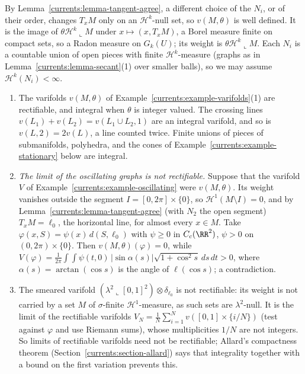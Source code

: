 By Lemma~\ref{currents:lemma-tangent-agree}, a different choice of the $N_i$, or of their order, changes $T_xM$ only on an $\mathcal{H}^k$-null set, so $v(M, \theta)$ is well defined. It is the image of
$\theta\mathcal{H}^k\llcorner M$ under $x \mapsto (x, T_xM)$, a Borel measure finite on compact sets, so a Radon measure on $G_k(U)$; its weight is $\theta\mathcal{H}^k\llcorner M$. Each $N_i$ is a countable
union of open pieces with finite $\mathcal{H}^k$-measure (graphs as in Lemma~\ref{currents:lemma-secant}(1) over smaller balls), so we may assume $\mathcal{H}^k(N_i) < \infty$.

\begin{example}\label{currents:example-rectifiable}
\begin{enumerate}
\item The varifolds $v(M, \theta)$ of Example~\ref{currents:example-varifolds}(1) are rectifiable, and integral when $\theta$ is integer valued. The crossing lines $v(L_1) + v(L_2) = v(L_1 \cup L_2, 1)$ are
an integral varifold, and so is $v(L, 2) = 2v(L)$, a line counted twice. Finite unions of pieces of submanifolds, polyhedra, and the cones of Example~\ref{currents:example-stationary} below are integral.
\item \emph{The limit of the oscillating graphs is not rectifiable.} Suppose that the varifold $V$ of Example~\ref{currents:example-oscillating} were $v(M, \theta)$. Its weight vanishes outside the segment
$I = [0, 2\pi] \times \{0\}$, so $\mathcal{H}^1(M \setminus I) = 0$, and by Lemma~\ref{currents:lemma-tangent-agree} (with $N_2$ the open segment) $T_xM = \ell_0$, the horizontal line, for almost every
$x \in M$. Take $\varphi(x, S) = \psi(x)\,d(S, \ell_0)$ with $\psi \geq 0$ in $C_c(\RR^2)$, $\psi > 0$ on $(0, 2\pi) \times \{0\}$. Then $v(M, \theta)(\varphi) = 0$, while
$V(\varphi) = \frac1{2\pi}\int\int\psi(t, 0)\,|\sin\alpha(s)|\sqrt{1 + \cos^2s}\,ds\,dt > 0$, where $\alpha(s) = \arctan(\cos s)$ is the angle of $\ell(\cos s)$; a contradiction.
\item The smeared varifold $(\lambda^2\llcorner[0, 1]^2) \otimes \delta_{\ell_0}$ is not rectifiable: its weight is not carried by a set $M$ of $\sigma$-finite $\mathcal{H}^1$-measure, as such sets are
$\lambda^2$-null. It is the limit of the rectifiable varifolds $V_N = \frac1N\sum_{i=1}^Nv([0, 1] \times \{i/N\})$ (test against $\varphi$ and use Riemann sums), whose multiplicities $1/N$ are not integers.
So limits of rectifiable varifolds need not be rectifiable; Allard's compactness theorem (Section~\ref{currents:section-allard}) says that integrality together with a bound on the first variation prevents
this.
\end{enumerate}
\end{example}

